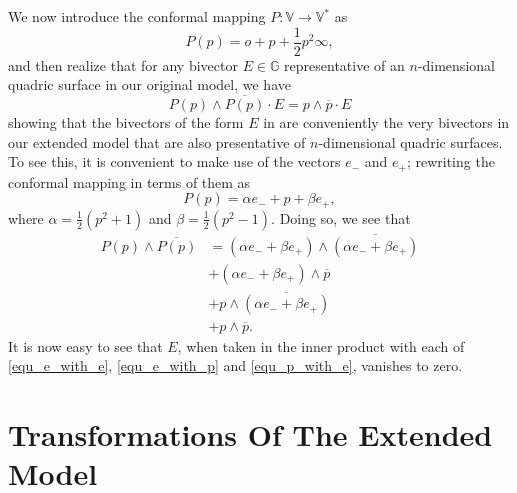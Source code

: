 \documentclass{birkjour}
\theoremstyle{definition}
\theoremstyle{remark}
\numberwithin{equation}{section}
\newcommand{\G}{\mathbb{G}}
\newcommand{\V}{\mathbb{V}}
\newcommand{\nvao}{o}
\newcommand{\nvai}{\infty}
\newcommand{\eminus}{e_{-}}
\newcommand{\eplus}{e_{+}}
\begin{document}
We now introduce the conformal mapping $P:\V\to\V^*$ as
\begin{equation}
P(p) = \nvao + p + \frac{1}{2}p^2\nvai,
\end{equation}
and then realize that for any bivector $E\in\G$ representative of an $n$-dimensional
quadric surface in our original model, we have
\begin{equation}
P(p)\wedge\overline{P(p)}\cdot E = p\wedge\overline{p}\cdot E
\end{equation}
showing that the bivectors of the form $E$ in \cite{Parkin12} are 
conveniently the very bivectors in our extended model that are also presentative
of $n$-dimensional quadric surfaces.  To see this, it is convenient
to make use of the vectors $\eminus$ and $\eplus$; rewriting the conformal
mapping in terms of them as
\begin{equation}
P(p) = \alpha\eminus + p + \beta\eplus,
\end{equation}
where $\alpha=\frac{1}{2}(p^2+1)$ and $\beta=\frac{1}{2}(p^2-1)$.
Doing so, we see that
\begin{align}
P(p)\wedge\overline{P(p)}
 &= (\alpha\eminus + \beta\eplus)\wedge\overline{(\alpha\eminus + \beta\eplus)}\label{equ_e_with_e} \\
 &+  (\alpha\eminus + \beta\eplus)\wedge\overline{p}\label{equ_e_with_p} \\
 &+ p\wedge\overline{(\alpha\eminus + \beta\eplus)}\label{equ_p_with_e} \\
 &+ p\wedge\overline{p}.
\end{align}
It is now easy to see that $E$, when taken in the inner product with
each of \eqref{equ_e_with_e}, \eqref{equ_e_with_p} and \eqref{equ_p_with_e}, vanishes to zero.

\section{Transformations Of The Extended Model}
\end{document}
